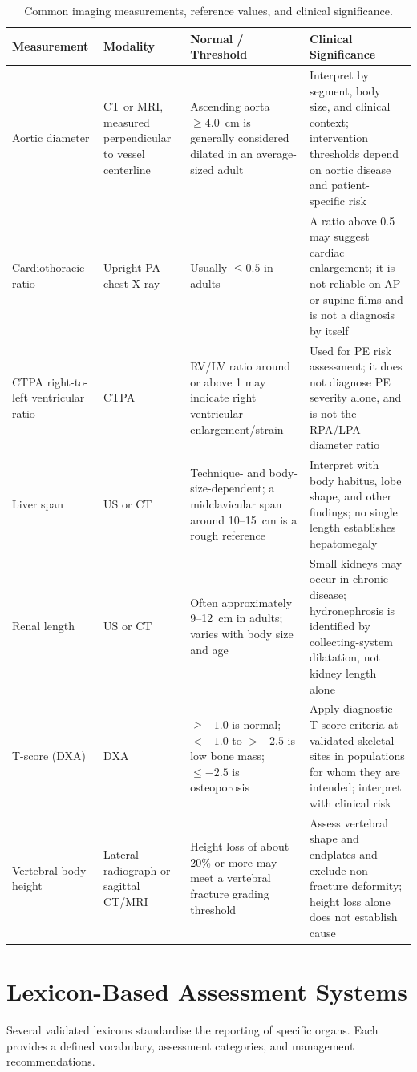 \begin{table}[h]
\centering
\caption{Common imaging measurements, reference values, and clinical significance.}
\label{tab:common_measurements}
\begin{tabular}{p{3.2cm} p{2.8cm} p{3.2cm} p{4.5cm}}
\toprule
\textbf{Measurement} & \textbf{Modality} & \textbf{Normal / Threshold} & \textbf{Clinical Significance} \\
\midrule
Aortic diameter & CT or MRI, measured perpendicular to vessel centerline & Ascending aorta $\geq4.0$~cm is generally considered dilated in an average-sized adult & Interpret by segment, body size, and clinical context; intervention thresholds depend on aortic disease and patient-specific risk \\
Cardiothoracic ratio & Upright PA chest X-ray & Usually $\leq0.5$ in adults & A ratio above 0.5 may suggest cardiac enlargement; it is not reliable on AP or supine films and is not a diagnosis by itself \\
CTPA right-to-left ventricular ratio & CTPA & RV/LV ratio around or above 1 may indicate right ventricular enlargement/strain & Used for PE risk assessment; it does not diagnose PE severity alone, and is not the RPA/LPA diameter ratio \\
Liver span & US or CT & Technique- and body-size-dependent; a midclavicular span around 10--15~cm is a rough reference & Interpret with body habitus, lobe shape, and other findings; no single length establishes hepatomegaly \\
Renal length & US or CT & Often approximately 9--12~cm in adults; varies with body size and age & Small kidneys may occur in chronic disease; hydronephrosis is identified by collecting-system dilatation, not kidney length alone \\
T-score (DXA) & DXA & $\geq -1.0$ is normal; $<-1.0$ to $>-2.5$ is low bone mass; $\leq-2.5$ is osteoporosis & Apply diagnostic T-score criteria at validated skeletal sites in populations for whom they are intended; interpret with clinical risk \\
Vertebral body height & Lateral radiograph or sagittal CT/MRI & Height loss of about 20\% or more may meet a vertebral fracture grading threshold & Assess vertebral shape and endplates and exclude non-fracture deformity; height loss alone does not establish cause \\
\bottomrule
\end{tabular}
\end{table}

\section{Lexicon-Based Assessment Systems}
Several validated lexicons standardise the reporting of specific organs. Each provides a defined vocabulary, assessment categories, and management recommendations.

